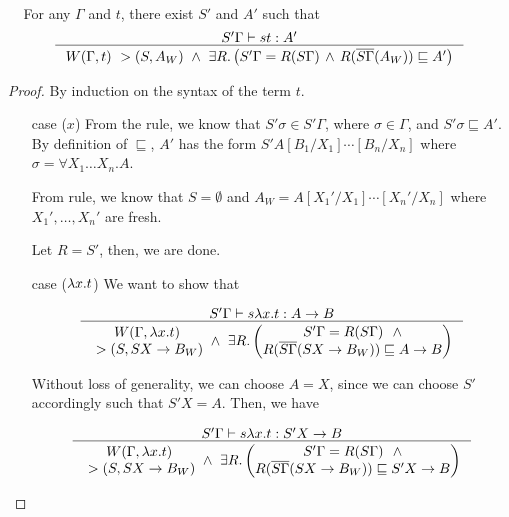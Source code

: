 \begin{theorem}[Completeness of $W$] \label{thm:completeW}
~\\ $~$ $~$ For any $\Gamma$ and $t$, there exist $S'$ and $A'$ such that
\[ \inference{ S'\Gamma |-s t : A' }{
	W(\Gamma,t) ~> (S,A_W) ~\land~
	\exists R . \left(
		S'\Gamma = R(S\Gamma) \,\land\,
		R(\overline{S\Gamma}(A_W))\sqsubseteq A' \right) }
\]
\end{theorem}
\begin{proof}
By induction on the syntax of the term $t$.
\begin{itemize}
\item[case]($x$)
	From the  rule, we know that
	$S'\sigma \in S'\Gamma$, where $\sigma\in\Gamma$,
	and $S'\sigma\sqsubseteq A'$.
	By definition of $\sqsubseteq$, $A'$ has the form
	$S'A[B_1/X_1]\cdots[B_n/X_n]$ where $\sigma = \forall X_1\dots X_n.A$.

	From  rule, we know that
	$S = \emptyset $ and $A_W = A[X_1'/X_1]\cdots[X_n'/X_n]$
	where $X_1',\dots,X_n'$ are fresh.

	Let $R=S'$, then, we are done.

\item[case]($\lambda x.t$)
	We want to show that \vspace*{-2em}
	\begin{singlespace}
	\[\inference{S'\Gamma |-s \l x.t : A -> B}{
	\begin{matrix} W(\Gamma,\l x.t) \\ ~> (S,S X -> B_W) \end{matrix}
	~\land~
	\exists R.
		\left(\begin{matrix}
			S'\Gamma=R(S\Gamma) ~~ \land \\
			R(\overline{S\Gamma}(SX -> B_W))\sqsubseteq A -> B
		\end{matrix}\right) } \]
	\end{singlespace}

	Without loss of generality, we can choose $A = X$,
	since we can choose $S'$ accordingly such that $S'X = A$.
	Then, we have \vspace*{-2em}
	\begin{singlespace}
	\[\inference{S'\Gamma |-s \l x.t : S'X -> B}{
	\begin{matrix} W(\Gamma,\l x.t) \\ ~> (S,S X -> B_W) \end{matrix}
	~\land~
	\exists R.
		\left(\begin{matrix}
			S'\Gamma=R(S\Gamma) ~~ \land \\
			R(\overline{S\Gamma}(SX -> B_W))\sqsubseteq S'X -> B
		\end{matrix}\right) } \]
	\end{singlespace}


\end{itemize}
\end{proof}
